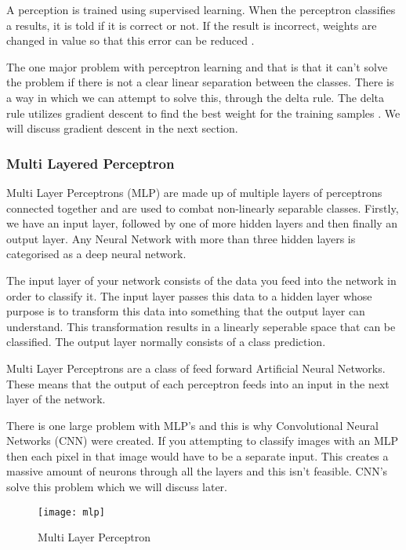 A perception is trained using supervised learning. When the perceptron
classifies a results, it is told if it is correct or not. If the result is
incorrect, weights are changed in value so that this error can be reduced
\textcite{AI}. 

The one major problem with perceptron learning and that is that it can't solve
the problem if there is not a clear linear separation between the classes. There
is a way in which we can attempt to solve this, through the delta rule. The
delta rule utilizes gradient descent to find the best weight for the training
samples \textcite{MLANN}. We will discuss gradient descent in the next section.

\subsubsection*{Multi Layered Perceptron}
Multi Layer Perceptrons (MLP) are made up of multiple layers of perceptrons connected
together and are used to combat non-linearly separable classes.
Firstly, we have an input layer, followed by one of more hidden layers and then
finally an output layer.
Any Neural Network with more than three hidden layers is categorised as a deep neural network.

The input layer of your network consists of the data you feed into the network
in order to classify it. The input layer passes this data to a hidden layer
whose purpose is to transform this data into something that the output layer can
understand. This transformation results in a linearly seperable space that can be classified. The output layer normally consists of a class prediction.

Multi Layer Perceptrons are a class of feed forward Artificial Neural Networks.
These means that the output of each perceptron feeds into an input in the next
layer of the network.

There is one large problem with MLP's and this is why Convolutional Neural
Networks (CNN) were created. If you attempting to classify images with an MLP then
each pixel in that image would have to be a separate input. This creates a
massive amount of neurons through all the layers and this isn't feasible. CNN's
solve this problem which we will discuss later.

\begin{figure}
    \texttt{[image: mlp]}
     \caption{Multi Layer Perceptron}
     \label{fig:mlp}
\end{figure}

